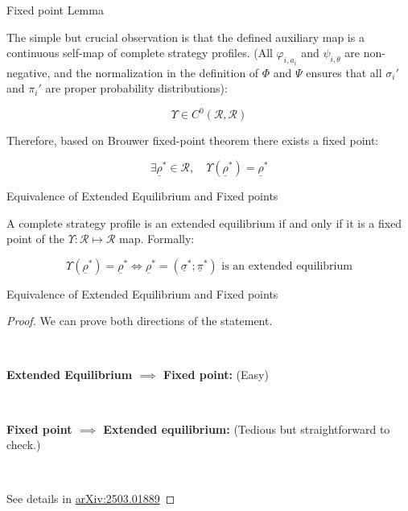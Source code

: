 \documentclass{beamer}
\theoremstyle{definition}
\begin{document}
\begin{frame}{Fixed point Lemma}

The simple but crucial observation is that the defined auxiliary map is a continuous self-map of complete strategy profiles. (All $\varphi_{i,a_i}$ and $\psi_{i,\theta}$ are non-negative, and the normalization in the definition of $\Phi$ and $\Psi$ ensures that all $\sigma_i'$ and $\pi_i'$ are proper probability distributions):

\begin{equation}
    \Upsilon \in C^0(\mathcal{R},\mathcal{R})
\end{equation}

Therefore, based on Brouwer fixed-point theorem there exists a fixed point:


    \begin{equation}
    \exists \underline{\rho}^* \in \mathcal{R}, \quad \Upsilon(\underline{\rho}^*) = \underline{\rho}^* 
    \end{equation}
    
\end{frame}

\begin{frame}{Equivalence of Extended Equilibrium and Fixed points}

    \begin{theorem}
\label{thm:Equivalence}
A complete strategy profile is an extended equilibrium if and only if it is a fixed point of the $\Upsilon : \mathcal{R} \mapsto \mathcal{R}$ map. Formally:

    \begin{equation}
        \Upsilon(\underline{\rho}^*) = \underline{\rho}^* \iff
        \underline{\rho}^*=(\underline{\sigma}^*;\underline{\pi}^*) \text { is an extended equilibrium}
    \end{equation}
\end{theorem}
    
\end{frame}

\begin{frame}{Equivalence of Extended Equilibrium and Fixed points}

    \begin{proof}

We can prove both directions of the statement.

\

{\bf Extended Equilibrium $\implies$ Fixed point:}
(Easy)


\

{\bf Fixed point $\implies$ Extended equilibrium:} (Tedious but straightforward to check.)

\

See details in \href{https://arxiv.org/abs/2503.01889}{arXiv:2503.01889}

\end{proof}
    
\end{frame}
\end{document}
